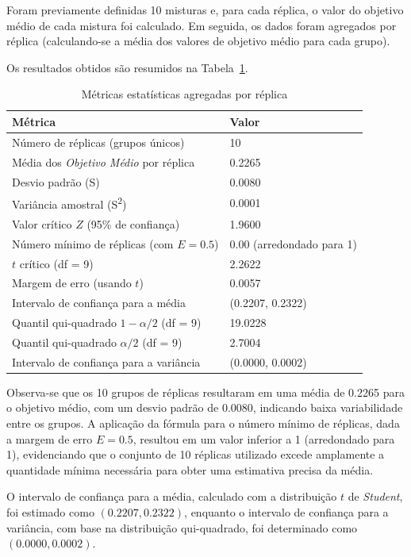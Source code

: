 \documentclass[
    12pt,                %
    openright,           %
    oneside,             %
    a4paper,             %
    english,             %
    spanish,             %
    brazil               %
]{ufscar}
\begin{document}
Foram previamente definidas 10 misturas e, para cada réplica, o valor do objetivo médio de cada mistura foi calculado. Em seguida, os dados foram agregados por réplica (calculando-se a média dos valores de objetivo médio para cada grupo).

Os resultados obtidos são resumidos na Tabela~\ref{tab:resultados}.

\begin{table}[ht]
\centering
\caption{Métricas estatísticas agregadas por réplica}
\label{tab:resultados}
\begin{tabular}{@{}ll@{}}
\toprule
Métrica & Valor \\ \midrule
Número de réplicas (grupos únicos) & 10 \\
Média dos \emph{Objetivo Médio} por réplica & 0.2265 \\
Desvio padrão (S) & 0.0080 \\
Variância amostral (S\textsuperscript{2}) & 0.0001 \\ \midrule
Valor crítico \(Z\) (95\% de confiança) & 1.9600 \\
Número mínimo de réplicas (com \(E=0.5\)) & 0.00 (arredondado para 1) \\ \midrule
\(t\) crítico (df = 9) & 2.2622 \\
Margem de erro (usando \(t\)) & 0.0057 \\
Intervalo de confiança para a média & (0.2207, 0.2322) \\ \midrule
Quantil qui-quadrado \(1-\alpha/2\) (df = 9) & 19.0228 \\
Quantil qui-quadrado \(\alpha/2\) (df = 9) & 2.7004 \\
Intervalo de confiança para a variância & (0.0000, 0.0002) \\
\bottomrule
\end{tabular}
\end{table}

Observa-se que os 10 grupos de réplicas resultaram em uma média de 0.2265 para o objetivo médio, com um desvio padrão de 0.0080, indicando baixa variabilidade entre os grupos. A aplicação da fórmula para o número mínimo de réplicas, dada a margem de erro \(E = 0.5\), resultou em um valor inferior a 1 (arredondado para 1), evidenciando que o conjunto de 10 réplicas utilizado excede amplamente a quantidade mínima necessária para obter uma estimativa precisa da média.

O intervalo de confiança para a média, calculado com a distribuição \(t\) de \textit{Student}, foi estimado como \((0.2207, 0.2322)\), enquanto o intervalo de confiança para a variância, com base na distribuição qui-quadrado, foi determinado como \((0.0000, 0.0002)\).
\end{document}
